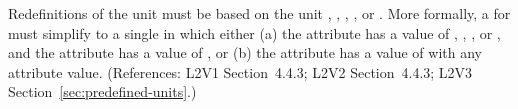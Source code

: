 Redefinitions of the  unit  must be based on the
unit , , , , or
.  More formally, a \UnitDefinition for
 must simplify to a single \Unit in which either
(a) the  attribute has a value of ,
, , or , and the 
attribute has a value of , or (b) the  attribute has a
value of  with any  attribute value.
(References: L2V1 Section~4.4.3; L2V2 Section~4.4.3; L2V3
Section~\ref{sec:predefined-units}.)
